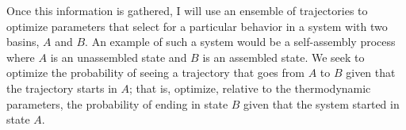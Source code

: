 \documentclass[11pt]{article}
\begin{document}


Once this information is gathered, I will use an ensemble of trajectories to optimize parameters that select for a particular behavior in a system with two basins, $A$ and $B$.  An example of such a system would be a self-assembly process where $A$ is an unassembled state and $B$ is an assembled state.  We seek to optimize the probability of seeing a trajectory that goes from $A$ to $B$ given that the trajectory starts in $A$; that is, optimize, relative to the thermodynamic parameters, the probability of ending in state $B$ given that the system started in state $A$.
\end{document}
